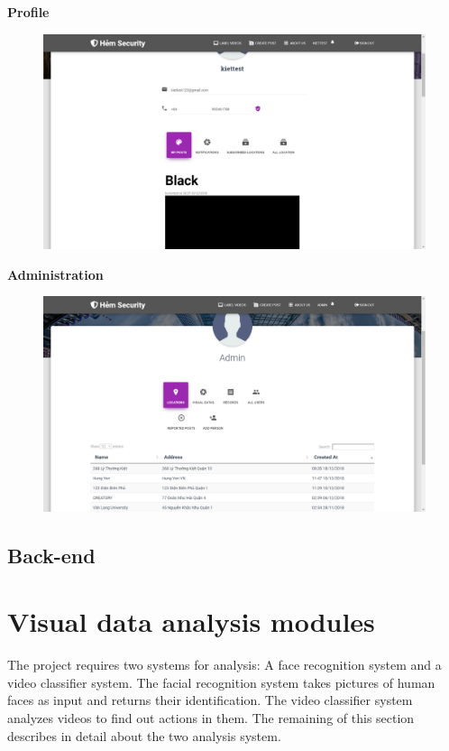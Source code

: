 \textbf{Profile}
\begin{center}
    \begin{figure}[H]
    \centering
    \includegraphics[width=1\columnwidth]{images/chap4/profile.png}
    \end{figure}
\end{center}

\textbf{Administration}
\begin{center}
    \begin{figure}[H]
    \centering
    \includegraphics[width=1\columnwidth]{images/chap4/admin.png}
    \end{figure}
\end{center}
\subsection{Back-end}
\section{Visual data analysis modules}
The project requires two systems for analysis: A face recognition system and a video classifier system. The facial recognition system takes pictures of human faces as input and returns their identification. The video classifier system analyzes videos to find out actions in them. The remaining of this section describes in detail about the two analysis system.
